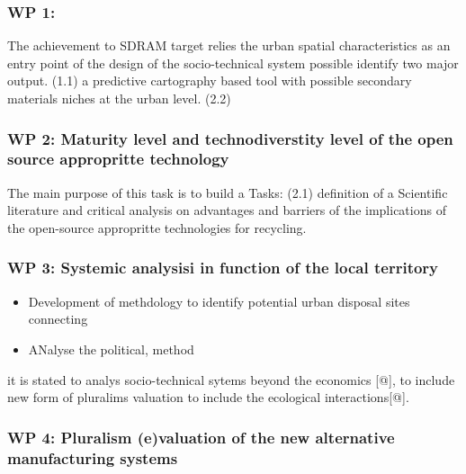\documentclass[
  11pt,
  a4paperpaper,
  onecolumn]{article}
\providecommand{\tightlist}{%
  \setlength{\itemsep}{0pt}\setlength{\parskip}{0pt}}\usepackage{longtable,booktabs,array}
\begin{document}
\hypertarget{wp-1}{%
\subsubsection{WP 1:}\label{wp-1}}

The achievement to SDRAM target relies the urban spatial characteristics
as an entry point of the design of the socio-technical system possible
identify two major output. (1.1) a predictive cartography based tool
with possible secondary materials niches at the urban level. (2.2)

\hypertarget{wp-2-maturity-level-and-technodiverstity-level-of-the-open-source-appropritte-technology}{%
\subsubsection{WP 2: Maturity level and technodiverstity level of the
open source appropritte
technology}\label{wp-2-maturity-level-and-technodiverstity-level-of-the-open-source-appropritte-technology}}

The main purpose of this task is to build a Tasks: (2.1) definition of a
Scientific literature and critical analysis on advantages and barriers
of the implications of the open-source appropritte technologies for
recycling.

\hypertarget{wp-3-systemic-analysisi-in-function-of-the-local-territory}{%
\subsubsection{WP 3: Systemic analysisi in function of the local
territory}\label{wp-3-systemic-analysisi-in-function-of-the-local-territory}}

\begin{itemize}
\tightlist
\item
  Development of methdology to identify potential urban disposal sites
  connecting
\item
  ANalyse the political, method
\end{itemize}

it is stated to analys socio-technical sytems beyond the economics
{[}@{]}, to include new form of pluralims valuation to include the
ecological interactions{[}@{]}.

\hypertarget{wp-4-pluralism-evaluation-of-the-new-alternative-manufacturing-systems}{%
\subsubsection{WP 4: Pluralism (e)valuation of the new alternative
manufacturing
systems}\label{wp-4-pluralism-evaluation-of-the-new-alternative-manufacturing-systems}}
\end{document}
